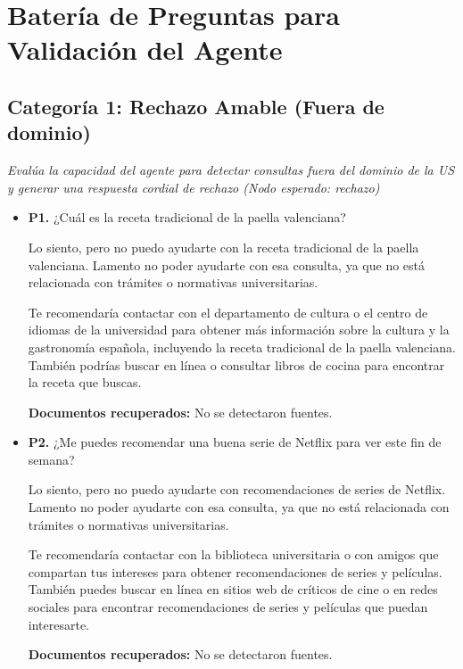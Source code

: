 \documentclass{article}
\begin{document}
\section{Batería de Preguntas para Validación del Agente}
\subsection{Categoría 1: Rechazo Amable (Fuera de dominio)}
\textit{Evalúa la capacidad del agente para detectar consultas fuera del dominio de la US y generar una respuesta cordial de rechazo (Nodo esperado: rechazo)}
\begin{itemize}
  \item \textbf{P1.} ¿Cuál es la receta tradicional de la paella valenciana? \\
    \begin{respuesta_agente}
      Lo siento, pero no puedo ayudarte con la receta tradicional de la paella valenciana. Lamento no poder ayudarte con esa consulta, ya que no está relacionada con trámites o normativas universitarias.

Te recomendaría contactar con el departamento de cultura o el centro de idiomas de la universidad para obtener más información sobre la cultura y la gastronomía española, incluyendo la receta tradicional de la paella valenciana. También podrías buscar en línea o consultar libros de cocina para encontrar la receta que buscas.
    \end{respuesta_agente}
    \vspace{0.2cm}
    \noindent\textbf{Documentos recuperados:} No se detectaron fuentes.

  \item \textbf{P2.} ¿Me puedes recomendar una buena serie de Netflix para ver este fin de semana? \\
    \begin{respuesta_agente}
      Lo siento, pero no puedo ayudarte con recomendaciones de series de Netflix. Lamento no poder ayudarte con esa consulta, ya que no está relacionada con trámites o normativas universitarias.

Te recomendaría contactar con la biblioteca universitaria o con amigos que compartan tus intereses para obtener recomendaciones de series y películas. También puedes buscar en línea en sitios web de críticos de cine o en redes sociales para encontrar recomendaciones de series y películas que puedan interesarte.
    \end{respuesta_agente}
    \vspace{0.2cm}
    \noindent\textbf{Documentos recuperados:} No se detectaron fuentes.


\end{itemize}
\end{document}
